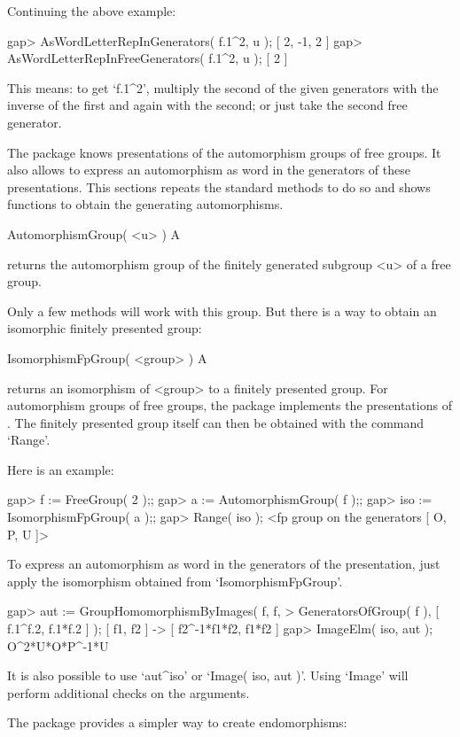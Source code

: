 Continuing the above example:

\beginexample
gap> AsWordLetterRepInGenerators( f.1^2, u );    
[ 2, -1, 2 ]
gap> AsWordLetterRepInFreeGenerators( f.1^2, u );
[ 2 ]
\endexample

This means: to get `f.1^2', multiply the second of the given generators
with the inverse of the first and again with the second; or just take
the second free generator.


The {\FGA} package knows presentations of the automorphism groups of free
groups. It also allows to express an automorphism as word in the
generators of these presentations.
This sections repeats the {\GAP} standard methods to do so and shows
functions to obtain the generating automorphisms.

\>AutomorphismGroup( <u> ) A

returns the automorphism group of the finitely generated subgroup <u>
of a free group.

Only a few methods will work with this group. But there is a way to
obtain an isomorphic finitely presented group:

\>IsomorphismFpGroup( <group> ) A

returns an isomorphism of <group> to a finitely presented group.  
For automorphism groups of free groups, the {\FGA} package implements
the presentations of \cite{Neumann33}.
The finitely presented group itself can then be obtained with the
command `Range'.

Here is an example:

\beginexample
gap> f := FreeGroup( 2 );;
gap> a := AutomorphismGroup( f );;
gap> iso := IsomorphismFpGroup( a );;
gap> Range( iso );
<fp group on the generators [ O, P, U ]>
\endexample

To express an automorphism as word in the generators of the
presentation, just apply the isomorphism obtained from
`IsomorphismFpGroup'.

\beginexample
gap> aut := GroupHomomorphismByImages( f, f,
>              GeneratorsOfGroup( f ), [ f.1^f.2, f.1*f.2 ] );
[ f1, f2 ] -> [ f2^-1*f1*f2, f1*f2 ]
gap> ImageElm( iso, aut );
O^2*U*O*P^-1*U
\endexample

It is also possible to use `aut^iso' or `Image( iso, aut )'.
Using `Image' will perform additional checks on the arguments.

The {\FGA} package provides a simpler way to create endomorphisms:

